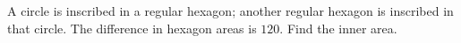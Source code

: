 A circle is inscribed in a regular hexagon; another regular hexagon is inscribed in that circle. The difference in hexagon areas is $120$. Find the inner area.
